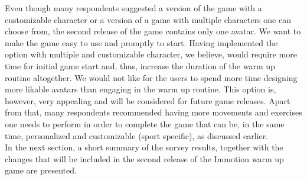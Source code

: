 Even though many respondents suggested a version of the game with a customizable character or a version of a game with multiple characters one can choose from, the second release of the game contains only one avatar. We want to make the game easy to use and promptly to start. Having implemented the option with multiple and customizable character, we believe, would require more time for initial game start and, thus, increase the duration of the warm up routine altogether. We would not like for the users to spend more time designing more likable avatars than engaging in the warm up routine. This option is, however, very appealing and will be considered for future game releases. Apart from that, many respondents recommended having more movements and exercises one needs to perform in order to complete the game that can be, in the same time, personalized and customizable (sport specific), as discussed earlier.\\In the next section, a short summary of the survey results, together with the changes that will be included in the second release of the Immotion warm up game are presented. \pagebreak
